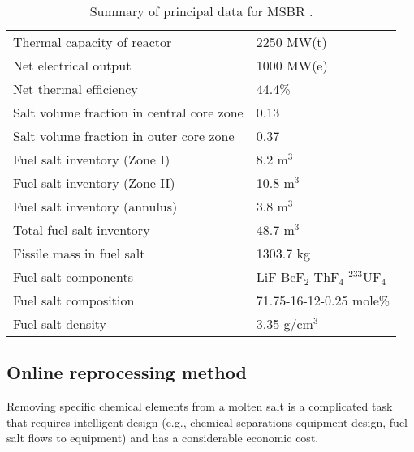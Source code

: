 \begin{table}[h!]
        \caption{Summary of principal data for MSBR \cite{robertson_conceptual_1971}.}
        \begin{tabularx}{\textwidth}{ s  s}
        \hline
                Thermal capacity of reactor           & 2250 MW(t)
                \\ 
                Net electrical output                 & 1000 MW(e) 
                \\  
                Net thermal efficiency        & 44.4\%
                \\  
                Salt volume fraction in central core zone     & 0.13
                \\ 
                Salt volume fraction in outer core zone       & 0.37
                \\ 
                Fuel salt inventory (Zone I)                  & 8.2 m$^3$	
                \\ 
                Fuel salt inventory (Zone II)                 & 10.8 m$^3$	
                \\ 
                Fuel salt inventory (annulus)                 & 3.8 m$^3$	
                \\  
                Total fuel salt inventory                     & 48.7 m$^3$	
                \\ 
                Fissile mass in fuel salt                   & 1303.7 kg	
                \\ 
                Fuel salt components                  & 
                LiF-BeF$_2$-ThF$_4$-$^{233}$UF$_4$	
                \\  
                Fuel salt composition                 & 
                71.75-16-12-0.25 mole\%
                \\
                Fuel salt density                    & 
                3.35 g/cm$^3$
                \\ \hline
        \end{tabularx}
        \label{tab:msbr_tab}
\end{table}

\subsection{Online reprocessing method}
Removing specific chemical elements from a molten salt is a complicated task that requires intelligent design (e.g., chemical separations equipment design, fuel salt flows to equipment) and has a considerable economic cost. 

